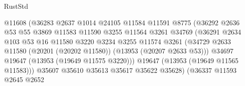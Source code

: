 \begin{lexlean}{RustStd}
\begin{coremodule}
                                        @11608
                                        (@36283
                                          @2637
                                          @1014
                                          @24105
                                          @11584
                                          @11591
                                          @8775
                                          (@36292
                                            @2636
                                            @53
                                            @55
                                            @3869
                                            @11583
                                            @11590
                                            @3255
                                            @11564
                                            @3261
                                            @34769
                                            (@36291
                                              @2634
                                              @103
                                              @53
                                              @16
                                              @11580
                                              @3220
                                              @3234
                                              @3255
                                              @11574
                                              @3261
                                              (@34729
                                                @2633
                                                @11580
                                                (@20201 (@20202 @11580))
                                                (@13953 (@20207 @2633 @53)))
                                              @34697
                                              @19647
                                              (@13953 (@19649 @11575 @3220)))
                                            @19647
                                            (@13953 (@19649 @11565 @11583)))
                                          @35607
                                          @35610
                                          @35613
                                          @35617
                                          @35622
                                          @35628)
                                        (@36337
                                          @11593
                                          @2645
                                          @2652

\end{coremodule}
\end{lexlean}
